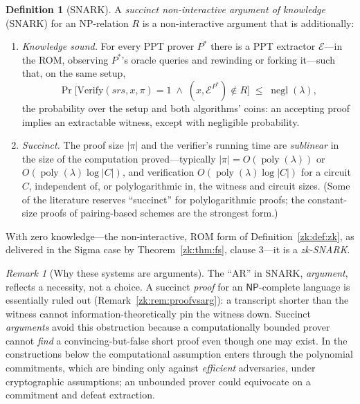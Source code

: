 \documentclass[11pt,a4paper]{article}
\theoremstyle{definition}
\newtheorem{definition}[theorem]{Definition}
\theoremstyle{remark}
\newtheorem{remark}[theorem]{Remark}
\DeclareMathOperator{\negl}{negl}
\DeclareMathOperator{\poly}{poly}
\providecommand{\abs}[1]{\lvert #1 \rvert}
\begin{document}
\begin{definition}[SNARK]\label{zk:def:snark}
A \emph{succinct non-interactive argument of knowledge} (SNARK) for
an NP-relation \(R\) is a non-interactive argument that is
additionally:
\begin{enumerate}
\item \emph{Knowledge sound.} For every PPT prover \(P^{*}\) there
  is a PPT extractor \(\mathcal E\)---in the ROM, observing
  \(P^{*}\)'s oracle queries and rewinding or forking it---such
  that, on the same setup,
  \[
  \Pr\bigl[\mathrm{Verify}(srs, x, \pi) = 1
    \;\wedge\; (x, \mathcal E^{P^{*}}) \notin R\bigr]
  \;\le\; \negl(\lambda),
  \]
  the probability over the setup and both algorithms' coins: an
  accepting proof implies an extractable witness, except with
  negligible probability.
\item \emph{Succinct.} The proof size \(\abs{\pi}\) and the
  verifier's running time are \emph{sublinear} in the size of the
  computation proved---typically
  \(\abs{\pi} = O(\poly(\lambda))\) or
  \(O(\poly(\lambda) \log \abs{C})\), and verification
  \(O(\poly(\lambda) \log \abs{C})\) for a circuit \(C\),
  independent of, or polylogarithmic in, the witness and circuit
  sizes. (Some of the literature reserves ``succinct'' for
  polylogarithmic proofs; the constant-size proofs of pairing-based
  schemes are the strongest form.)
\end{enumerate}
With zero knowledge---the non-interactive, ROM form of
Definition~\ref{zk:def:zk}, as delivered in the Sigma case by
Theorem~\ref{zk:thm:fs}, clause 3---it is a \emph{zk-SNARK}.
\end{definition}

\begin{remark}[Why these systems are arguments]
\label{zk:rem:succinctness-args}
The ``AR'' in SNARK, \emph{argument}, reflects a necessity, not a
choice. A succinct \emph{proof} for an \(\mathsf{NP}\)-complete
language is essentially ruled out (Remark~\ref{zk:rem:proofvsarg}): a
transcript shorter than the witness cannot information-theoretically
pin the witness down. Succinct \emph{arguments} avoid this obstruction
because a computationally bounded prover cannot \emph{find} a
convincing-but-false short proof even though one may exist. In the
constructions below the computational assumption enters through the
polynomial commitments, which are binding only against
\emph{efficient} adversaries, under cryptographic assumptions; an
unbounded prover could equivocate on a commitment and defeat
extraction.
\end{remark}
\end{document}
